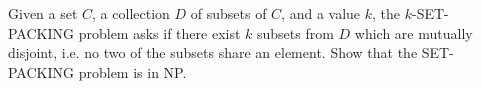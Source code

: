 \problem{}
Given a set $C$, a collection $D$ of subsets of $C$, and a value $k$, the $k$-SET-PACKING problem asks if there exist $k$ subsets from $D$ which are mutually disjoint, i.e. no two of the subsets share an element.  Show that the SET-PACKING problem is in NP.


\solution{
}

\newpage
